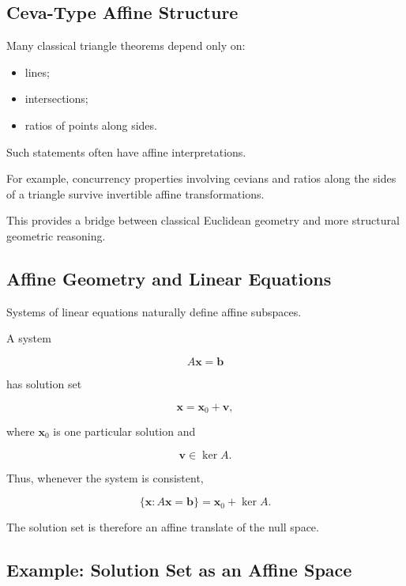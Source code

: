 \subsection{Ceva-Type Affine Structure}
\label{subsec:affine-ceva-structure}

Many classical triangle theorems depend only on:

\begin{itemize}
    \item lines;
    \item intersections;
    \item ratios of points along sides.
\end{itemize}

Such statements often have affine interpretations.

For example, concurrency properties involving cevians and ratios along the
sides of a triangle survive invertible affine transformations.

This provides a bridge between classical Euclidean geometry and more
structural geometric reasoning.

\subsection{Affine Geometry and Linear Equations}
\label{subsec:affine-linear-equations}

Systems of linear equations naturally define affine subspaces.

A system

\[ A\mathbf{x}=\mathbf{b} \]

has solution set

\[ \mathbf{x}=\mathbf{x}_0+\mathbf{v}, \]

where \(\mathbf{x}_0\) is one particular solution and

\[ \mathbf{v}\in\ker A. \]

Thus, whenever the system is consistent,

\[
\boxed{
\{\mathbf{x}:A\mathbf{x}=\mathbf{b}\}
=
\mathbf{x}_0+\ker A.
}
\]

The solution set is therefore an affine translate of the null space.

\subsection{Example: Solution Set as an Affine Space}
\label{subsec:solution-set-affine}

